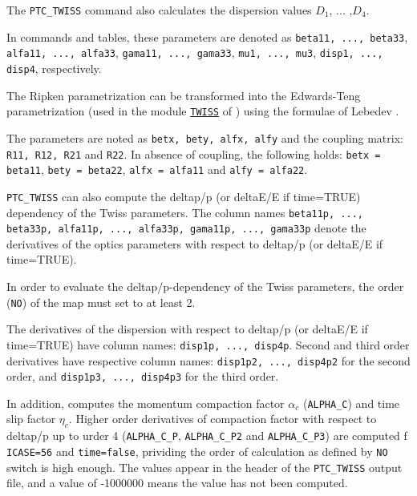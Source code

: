 The \texttt{PTC\_TWISS} command also calculates the dispersion values
$D_1$, ... ,$D_4$.

In \madx commands and tables, these parameters are denoted as
\texttt{beta11, ..., beta33}, \texttt{alfa11, ..., alfa33},
\texttt{gama11, ..., gama33}, \texttt{mu1, ..., mu3},
\texttt{disp1, ..., disp4}, respectively. 

The Ripken parametrization can be transformed into the Edwards-Teng
parametrization (used in the module
\hyperref[chap:twiss]{\texttt{TWISS}} of \madx) using the formulae of
Lebedev \cite{lebedev2010}. 

The parameters are noted as \texttt{betx, bety, alfx, alfy} and the
coupling matrix: \texttt{R11, R12, R21} and \texttt{R22}. In absence of
coupling, the following holds: \texttt{betx = beta11}, \texttt{bety = beta22},
\texttt{alfx = alfa11} and \texttt{alfy = alfa22}.

\texttt{PTC\_TWISS} can also compute the deltap/p 
(or deltaE/E if time=TRUE) dependency 
of the Twiss parameters. The column names \texttt{beta11p, ..., beta33p,
  alfa11p, ..., alfa33p, gama11p, ..., gama33p} denote the derivatives of
the optics parameters with respect to deltap/p (or deltaE/E if time=TRUE). 

In order to evaluate the deltap/p-dependency of the Twiss parameters,
the order (\texttt{NO}) of the map must set to at least 2.  

The derivatives of the dispersion with respect to deltap/p (or deltaE/E if time=TRUE)
have column names: \texttt{disp1p, ..., disp4p}. 
Second and third order derivatives have respective column names:  
\texttt{disp1p2, ..., disp4p2} for the second order, and 
\texttt{disp1p3, ..., disp4p3} for the third order.

In addition, \ptc computes the momentum compaction factor $\alpha_c$ (\texttt{ALPHA\_C}) and time 
slip factor $\eta_c$. Higher order derivatives of compaction factor  
with respect to deltap/p up to urder 4  (\texttt{ALPHA\_C\_P}, \texttt{ALPHA\_C\_P2} and \texttt{ALPHA\_C\_P3})
are computed  f \texttt{ICASE=56} and \texttt{time=false}, prividing the order of 
calculation as defined by \texttt{NO} switch is high enough.
The values appear in the header of the \texttt{PTC\_TWISS} output file, 
and a value of -1000000 means the value has not been computed.


